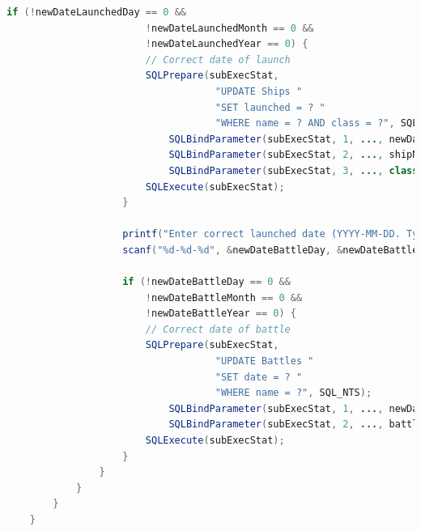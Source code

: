 \documentclass[12pt]{article}
\begin{document}
\begin{enumerate}[1.]
\begin{enumerate}[a)]
\begin{lstlisting}[language=JAVA]
                    if (!newDateLaunchedDay == 0 &&
                        !newDateLaunchedMonth == 0 &&
                        !newDateLaunchedYear == 0) {
                        // Correct date of launch
                        SQLPrepare(subExecStat,
                                    "UPDATE Ships "
                                    "SET launched = ? "
                                    "WHERE name = ? AND class = ?", SQL_NTS);
                            SQLBindParameter(subExecStat, 1, ..., newDateLaunched, ...);
                            SQLBindParameter(subExecStat, 2, ..., shipName, ...);
                            SQLBindParameter(subExecStat, 3, ..., class, ...);
                        SQLExecute(subExecStat);
                    }

                    printf("Enter correct launched date (YYYY-MM-DD. Type 0-0-0 to skip):\n");
                    scanf("%d-%d-%d", &newDateBattleDay, &newDateBattleMonth, &newDateBattleYear);

                    if (!newDateBattleDay == 0 &&
                        !newDateBattleMonth == 0 &&
                        !newDateBattleYear == 0) {
                        // Correct date of battle
                        SQLPrepare(subExecStat,
                                    "UPDATE Battles "
                                    "SET date = ? "
                                    "WHERE name = ?", SQL_NTS);
                            SQLBindParameter(subExecStat, 1, ..., newDateBattle, ...);
                            SQLBindParameter(subExecStat, 2, ..., battle, ...);
                        SQLExecute(subExecStat);
                    }
                }
            }
        }
    }
    \end{lstlisting}

    \end{enumerate}

\end{enumerate}
\end{document}
